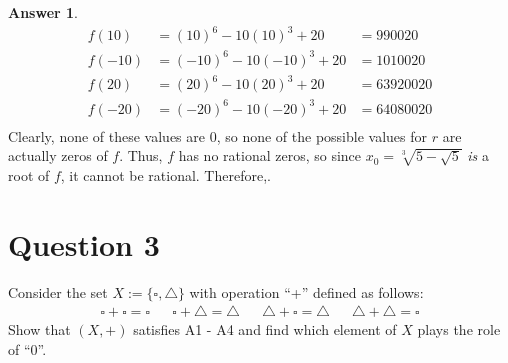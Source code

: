 \documentclass[10pt,a4paper]{article}
\theoremstyle{definition}
\newtheorem*{answer*}{Answer}
\begin{document}
\begin{answer*}{$ $}
\begin{align*}
f(10) &= (10)^6 - 10(10)^3 + 20 &= 990020\\
f(-10) &= (-10)^6 - 10(-10)^3 + 20 &= 1010020\\
f(20) &= (20)^6 - 10(20)^3 + 20 &= 63920020\\
f(-20) &= (-20)^6 - 10(-20)^3 + 20 &= 64080020\\
\end{align*}
Clearly, none of these values are $0$, so none of the possible values for $r$ are actually zeros of $f$. Thus, $f$ has no rational zeros, so since $x_0 = \sqrt[3]{5 - \sqrt{5}}$ \textit{is} a root of $f$, it cannot be rational. Therefore,.
\end{answer*}

\newpage

\section*{Question 3}
Consider the set $X := \{\square, \triangle\}$ with operation \enquote{+} defined as follows:
\begin{align*}
\square + \square = \square && \square + \triangle = \triangle && \triangle + \square = \triangle && \triangle + \triangle = \square
\end{align*}
Show that $(X, +)$ satisfies A1 - A4 and find which element of $X$ plays the role of \enquote{0}.
\end{document}
